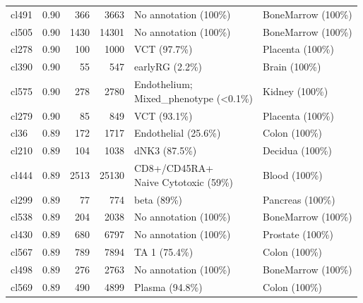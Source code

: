 \begin{table}[ht!]
\begin{tabular}{lrrrll}
  cl491 & 0.90 & 366 & 3663 & No annotation (100\%) & BoneMarrow (100\%) \\ 
  cl505 & 0.90 & 1430 & 14301 & No annotation (100\%) & BoneMarrow (100\%) \\ 
  cl278 & 0.90 & 100 & 1000 & VCT (97.7\%) & Placenta (100\%) \\ 
  cl390 & 0.90 &  55 & 547 & earlyRG (2.2\%) & Brain (100\%) \\ 
  cl575 & 0.90 & 278 & 2780 & \specialcell[t]{Endothelium;\\Mixed\_phenotype (<0.1\%)} & Kidney (100\%) \\ 
  cl279 & 0.90 &  85 & 849 & VCT (93.1\%) & Placenta (100\%) \\ 
  cl36 & 0.89 & 172 & 1717 & Endothelial (25.6\%) & Colon (100\%) \\ 
  cl210 & 0.89 & 104 & 1038 & dNK3 (87.5\%) & Decidua (100\%) \\ 
  cl444 & 0.89 & 2513 & 25130 & \specialcell[t]{CD8+/CD45RA+\\Naive Cytotoxic (59\%)} & Blood (100\%) \\ 
  cl299 & 0.89 &  77 & 774 & beta (89\%) & Pancreas (100\%) \\ 
  cl538 & 0.89 & 204 & 2038 & No annotation (100\%) & BoneMarrow (100\%) \\ 
  cl430 & 0.89 & 680 & 6797 & No annotation (100\%) & Prostate (100\%) \\ 
  cl567 & 0.89 & 789 & 7894 & TA 1 (75.4\%) & Colon (100\%) \\ 
  cl498 & 0.89 & 276 & 2763 & No annotation (100\%) & BoneMarrow (100\%) \\ 
  cl569 & 0.89 & 490 & 4899 & Plasma (94.8\%) & Colon (100\%) \\ 
   \bottomrule
\end{tabular}
\end{table}  
  

